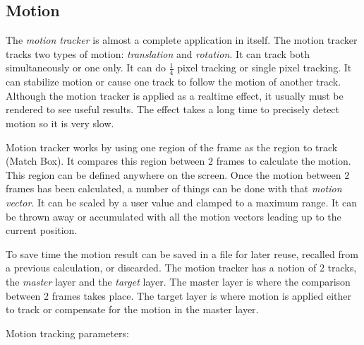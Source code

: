 \subsection{Motion}%
\label{sub:motion}

The \textit{motion tracker} is almost a complete application in itself. The motion tracker tracks two types of motion: \textit{translation} and \textit{rotation}. It can track both simultaneously or one only. It can do $\frac{1}{4}$ pixel tracking or single pixel tracking. It can stabilize motion or cause one track to follow the motion of another track. Although the motion tracker is applied as a realtime effect, it usually must be rendered to see useful results. The effect takes a long time to precisely detect motion so it is very slow.

Motion tracker works by using one region of the frame as the region to track (Match Box). It compares this region between $2$ frames to calculate the motion. This region can be defined anywhere on the screen. Once the motion between $2$ frames has been calculated, a number of things can be done with that \textit{motion vector}. It can be scaled by a user value and clamped to a maximum range. It can be thrown away or accumulated with all the motion vectors leading up to the current position.

To save time the motion result can be saved in a file for later reuse, recalled from a previous calculation, or discarded. The motion tracker has a notion of $2$ tracks, the \textit{master} layer and the \textit{target} layer. The master layer is where the comparison between $2$ frames takes place. The target layer is where motion is applied either to track or compensate for the motion in the master layer.

Motion tracking parameters:

